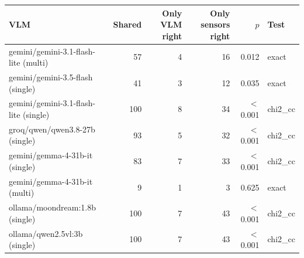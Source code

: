 \begin{tabular}{lrrrrl}
\toprule
VLM & Shared & Only VLM right & Only sensors right & $p$ & Test \\
\midrule
gemini/gemini-3.1-flash-lite (multi) & 57 & 4 & 16 & 0.012 & exact \\
gemini/gemini-3.5-flash (single) & 41 & 3 & 12 & 0.035 & exact \\
gemini/gemini-3.1-flash-lite (single) & 100 & 8 & 34 & $<$0.001 & chi2\_cc \\
groq/qwen/qwen3.8-27b (single) & 93 & 5 & 32 & $<$0.001 & chi2\_cc \\
gemini/gemma-4-31b-it (single) & 83 & 7 & 33 & $<$0.001 & chi2\_cc \\
gemini/gemma-4-31b-it (multi) & 9 & 1 & 3 & 0.625 & exact \\
ollama/moondream:1.8b (single) & 100 & 7 & 43 & $<$0.001 & chi2\_cc \\
ollama/qwen2.5vl:3b (single) & 100 & 7 & 43 & $<$0.001 & chi2\_cc \\
\bottomrule
\end{tabular}